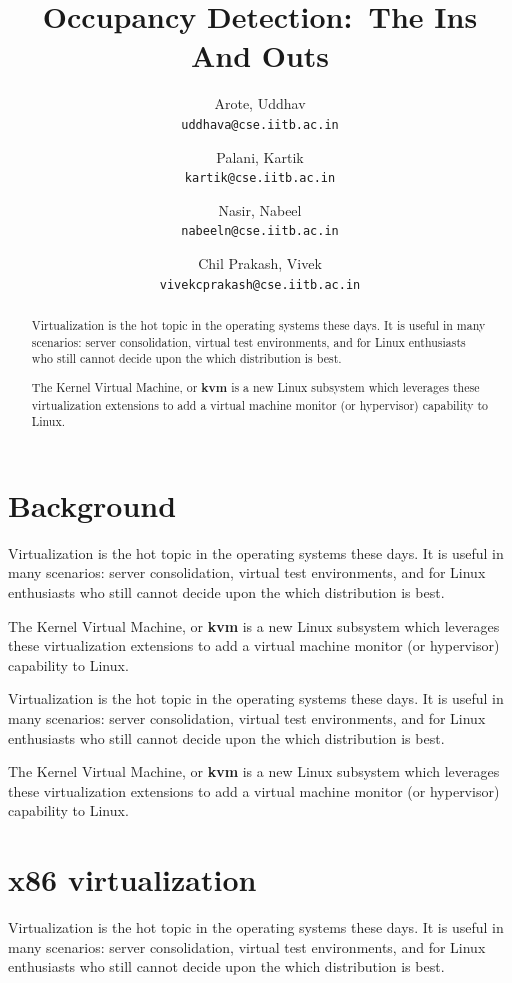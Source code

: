 \documentclass[a4paper,twocolumn,10pt]{article}
\title{Occupancy Detection:\ The Ins And Outs}
\author{
    Arote, Uddhav\\
    \texttt{uddhava@cse.iitb.ac.in}\and
    Palani, Kartik\\
    \texttt{kartik@cse.iitb.ac.in}\and
    Nasir, Nabeel\\
    \texttt{nabeeln@cse.iitb.ac.in}\and
    Chil Prakash, Vivek\\
    \texttt{vivekcprakash@cse.iitb.ac.in}
}
\begin{document}
\maketitle

\begin{abstract}




  Virtualization\cite{Boney96} is the hot topic in the operating systems 
  these days. It is useful in many scenarios: server consolidation,
  virtual test environments, and for Linux enthusiasts who
  still cannot decide upon the which distribution is best.
  
  \noindent The Kernel Virtual Machine, or \textbf{kvm} is a new Linux
  subsystem which leverages these virtualization extensions
  to add a virtual machine monitor (or hypervisor) capability to Linux.
\end{abstract}

\section{Background}
  Virtualization is the hot topic in the operating systems\cite{MG} 
  these days. It is useful in many scenarios: server consolidation,
  virtual test environments, and for Linux enthusiasts who
  still cannot decide upon the which distribution is best.
  
  \noindent The Kernel Virtual Machine, or \textbf{kvm} is a new Linux
  subsystem which leverages these virtualization extensions
  to add a virtual machine monitor (or hypervisor) capability to Linux.

  
  \noindent Virtualization is the hot topic in the operating systems 
  these days. It is useful in many scenarios: server consolidation,
  virtual test environments, and for Linux enthusiasts who
  still cannot decide upon the which distribution is best.
  
  \noindent The Kernel Virtual Machine, or \textbf{kvm} is a new Linux
  subsystem which leverages these virtualization extensions
  to add a virtual machine monitor (or hypervisor) capability to Linux.

  
\section{x86 virtualization}
Virtualization is the hot topic in the operating systems 
  these days. It is useful in many scenarios: server consolidation,
  virtual test environments, and for Linux enthusiasts who
  still cannot decide upon the which distribution is best.
  
\end{document}
